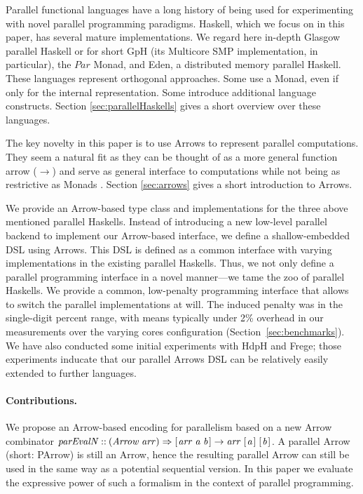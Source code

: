 \documentclass{jfp1}
\newcommand{\Conid}[1]{\mathit{#1}}
\newcommand{\Varid}[1]{\mathit{#1}}
\newcommand{\comm}[2]{}
\newcommand{\olcomment}[1]{\comm{OL}{#1}}
\begin{document}
Parallel functional languages have a long history of being used for experimenting with novel parallel programming paradigms. Haskell, which we focus on in this paper, has  several mature implementations. We regard here in-depth
Glasgow parallel Haskell or for short GpH (its Multicore SMP implementation, in particular), the
\ensuremath{\Conid{Par}} Monad, and Eden, a distributed memory parallel Haskell. These
languages represent orthogonal approaches. Some use a Monad, even if
only for the internal representation. Some introduce additional
language constructs. Section \ref{sec:parallelHaskells} gives a short overview over these languages.

The key novelty in this paper is to use Arrows to represent parallel computations. They seem a natural fit as they can be thought of as a more general function arrow (\ensuremath{\to }) and serve as general interface to computations while not being as restrictive as Monads \citep{HughesArrows}. Section \ref{sec:arrows} gives a short introduction to Arrows.

We provide an Arrow-based type class and implementations for the three above mentioned parallel Haskells.
Instead of 
introducing a new low-level parallel backend to implement our
Arrow-based interface, we define a shallow-embedded DSL using Arrows. This DSL
is defined as a common interface with varying implementations in
the existing parallel Haskells. Thus, we not only define a parallel programming interface in a
novel manner---we tame the zoo of parallel Haskells. We provide a
common, low-penalty programming interface that allows to switch
the parallel implementations at will. The induced penalty was in the single-digit percent range, with means typically under 2\% overhead in our measurements over the varying cores configuration (Section~\ref{sec:benchmarks}). We have also conducted some initial experiments with HdpH and Frege; those experiments inducate that our parallel Arrows DSL can be relatively easily extended to further languages.

\paragraph{Contributions.}
%
%
We propose an Arrow-based encoding for parallelism based on a new Arrow combinator \ensuremath{\Varid{parEvalN}\mathbin{::}(\Conid{Arrow}\;\Varid{arr})\Rightarrow [\mskip1.5mu \Varid{arr}\;\Varid{a}\;\Varid{b}\mskip1.5mu]\to \Varid{arr}\;[\mskip1.5mu \Varid{a}\mskip1.5mu]\;[\mskip1.5mu \Varid{b}\mskip1.5mu]{}}. A parallel Arrow (short: PArrow) is still an Arrow, hence the resulting parallel Arrow can still be used in the same way as a potential sequential version. In this paper we evaluate the expressive power of such a formalism in the context of parallel programming.
\end{document}
